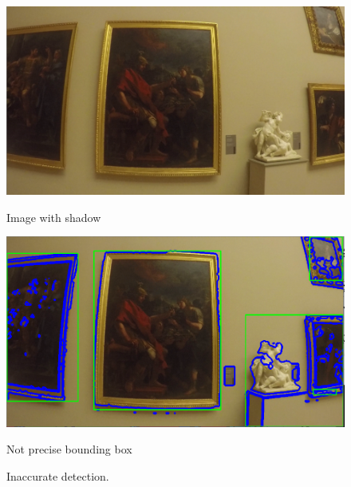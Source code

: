 \begin{figure}[h]
      \includegraphics[width=\linewidth]{pictures/painting_detection/detection_withoutNN_1.PNG}
      \caption*{Image with shadow}\label{fig:shadow1}
    \endminipage\hfill
      \includegraphics[width=\linewidth]{pictures/painting_detection/detection_withoutNN_3.PNG}
      \caption*{Not precise bounding box}\label{fig:shadow2}
    \endminipage\hfill
    \caption{Inaccurate detection.}\label{fig:innaccurate_detection}
\end{figure}







